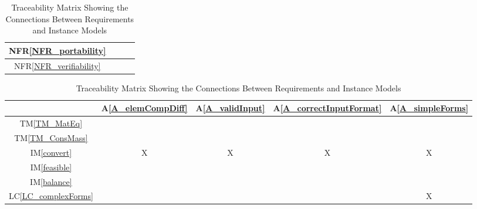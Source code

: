 \documentclass[12pt]{article}
\newcommand{\tmref}[1]{TM\ref{#1}}
\newcommand{\aref}[1]{A\ref{#1}}
\newcommand{\iref}[1]{IM\ref{#1}}
\newcommand{\nfrref}[1]{NFR\ref{#1}}
\newcommand{\lcref}[1]{LC\ref{#1}}
\begin{document}
\begin{table}[h!]
{\begin{tabular}{|c|c|c|c|}
      \nfrref{NFR_portability}       &                &                 &                \\ \hline %
      \nfrref{NFR_verifiability}     &                &                 &                \\ \hline %
    \end{tabular}
    \caption{Traceability Matrix Showing the Connections Between Requirements and Instance Models}
    \label{Table:R_trace}
  }
  \hfill
  \parbox{.45\linewidth}{
    \centering
    \begin{tabular}{|c|c|c|c|c|}
      \hline
                                      & \aref{A_elemCompDiff} & \aref{A_validInput} & \aref{A_correctInputFormat} & \aref{A_simpleForms} \\
      \hline
      \tmref{TM_MatEq}                &                       &                     &                             &                      \\ \hline
      \tmref{TM_ConsMass}             &                       &                     &                             &                      \\ \hline
      \iref{convert}                  & X                     & X                   & X                           & X                    \\ \hline
      \iref{feasible}                 &                       &                     &                             &                      \\ \hline
      \iref{balance}                  &                       &                     &                             &                      \\ \hline
      \lcref{LC_complexForms}         &                       &                     &                             & X                    \\ \hline

\end{tabular}}
\end{table}
\end{document}
